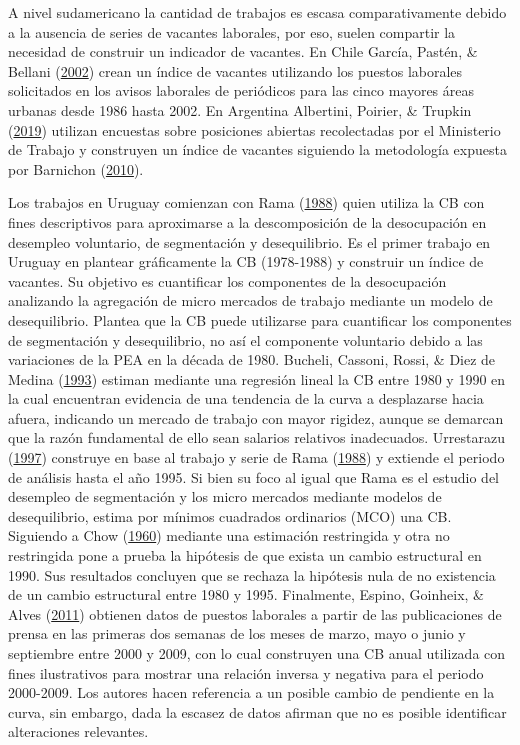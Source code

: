 \documentclass[12pt,oneside]{reedthesis}
\begin{document}
A nivel sudamericano la cantidad de trabajos es escasa comparativamente debido a la ausencia de series de vacantes laborales, por eso, suelen compartir la necesidad de construir un indicador de vacantes. En Chile García, Pastén, \& Bellani (\protect\hyperlink{ref-BankChile2002}{2002}) crean un índice de vacantes utilizando los puestos laborales solicitados en los avisos laborales de periódicos para las cinco mayores áreas urbanas desde 1986 hasta 2002.
En Argentina Albertini, Poirier, \& Trupkin (\protect\hyperlink{ref-ArgentinaBC2019}{2019}) utilizan encuestas sobre posiciones abiertas recolectadas por el Ministerio de Trabajo y construyen un índice de vacantes siguiendo la metodología expuesta por Barnichon (\protect\hyperlink{ref-Barnichon2010}{2010}).

Los trabajos en Uruguay comienzan con Rama (\protect\hyperlink{ref-Rama1988}{1988}) quien utiliza la CB con fines descriptivos para aproximarse a la descomposición de la desocupación en desempleo voluntario, de segmentación y desequilibrio. Es el primer trabajo en Uruguay en plantear gráficamente la CB (1978-1988) y construir un índice de vacantes. Su objetivo es cuantificar los componentes de la desocupación analizando la agregación de micro mercados de trabajo mediante un modelo de desequilibrio. Plantea que la CB puede utilizarse para cuantificar los componentes de segmentación y desequilibrio, no así el componente voluntario debido a las variaciones de la PEA en la década de 1980. Bucheli, Cassoni, Rossi, \& Diez de Medina (\protect\hyperlink{ref-DECON1993}{1993}) estiman mediante una regresión lineal la CB entre 1980 y 1990 en la cual encuentran evidencia de una tendencia de la curva a desplazarse hacia afuera, indicando un mercado de trabajo con mayor rigidez, aunque se demarcan que la razón fundamental de ello sean salarios relativos inadecuados. Urrestarazu (\protect\hyperlink{ref-Urrestarazu1997}{1997}) construye en base al trabajo y serie de Rama (\protect\hyperlink{ref-Rama1988}{1988}) y extiende el periodo de análisis hasta el año 1995. Si bien su foco al igual que Rama es el estudio del desempleo de segmentación y los micro mercados mediante modelos de desequilibrio, estima por mínimos cuadrados ordinarios (MCO) una CB. Siguiendo a Chow (\protect\hyperlink{ref-Chow1960}{1960}) mediante una estimación restringida y otra no restringida pone a prueba la hipótesis de que exista un cambio estructural en 1990. Sus resultados concluyen que se rechaza la hipótesis nula de no existencia de un cambio estructural entre 1980 y 1995. Finalmente, Espino, Goinheix, \& Alves (\protect\hyperlink{ref-Alma2011}{2011}) obtienen datos de puestos laborales a partir de las publicaciones de prensa en las primeras dos semanas de los meses de marzo, mayo o junio y septiembre entre 2000 y 2009, con lo cual construyen una CB anual utilizada con fines ilustrativos para mostrar una relación inversa y negativa para el periodo 2000-2009. Los autores hacen referencia a un posible cambio de pendiente en la curva, sin embargo, dada la escasez de datos afirman que no es posible identificar alteraciones relevantes.
\end{document}

